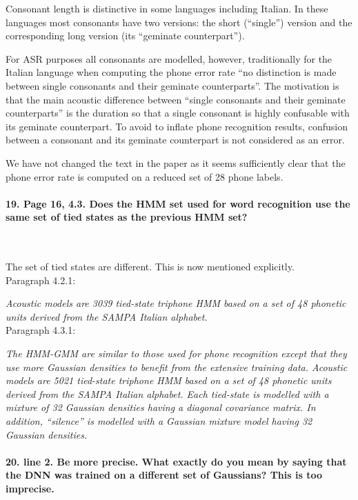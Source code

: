 \documentclass[]{article}
\begin{document}
Consonant length  is distinctive in some  languages including Italian.
In  these  languages most  consonants  have  two  versions: the  short
(``single'') version  and the corresponding long  version (its ``geminate                                                 
counterpart'').

For ASR  purposes all  consonants are modelled,  however, traditionally
for  the Italian  language when  computing the  phone error  rate ``no                                                    
distinction  is  made between  single  consonants  and their  geminate                                                    
counterparts''. The  motivation is  that the main  acoustic difference
between ``single  consonants and their geminate  counterparts'' is the
duration  so that  a single  consonant is  highly confusable  with its
geminate counterpart.  To avoid to inflate  phone recognition results,
confusion  between a  consonant and  its geminate  counterpart  is not
considered as an error.

We have  not changed the  text in the  paper as it  seems sufficiently
clear that  the phone error rate is  computed on a reduced  set of 28
phone labels.


\paragraph{19. Page 16, 4.3. Does the HMM set used for word recognition use the same set of tied states as the previous HMM set?}

~

The set of tied states are different. This is now mentioned explicitly.\\
Paragraph 4.2.1:

\textit{Acoustic models  are 3039 tied-state triphone HMM based on a set of 48 phonetic units derived from the SAMPA Italian alphabet.}
\\
Paragraph 4.3.1:

\textit{The HMM-GMM are similar to those used for phone recognition except that they use more Gaussian densities to benefit from the extensive training data. Acoustic models  are 5021 tied-state triphone HMM based on a set of  48 phonetic units  derived from the  SAMPA Italian alphabet. Each tied-state is modelled with  a mixture of  32 Gaussian densities   having  a  diagonal   covariance  matrix. In  addition, ``silence''  is  modelled  with  a  Gaussian mixture  model  having  32 Gaussian densities.}
\paragraph{20. line 2. Be more precise. What exactly do you mean by saying that the DNN was trained on a different set of Gaussians? This is too imprecise.}
\end{document}
